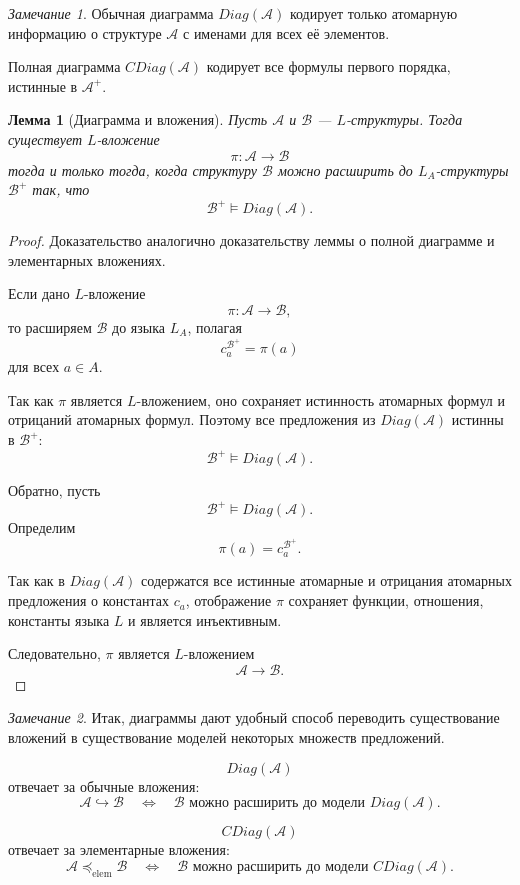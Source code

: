 \documentclass[12pt,a4paper,oneside,openany]{book}
\theoremstyle{definition}
\theoremstyle{plain}
\newtheorem{lemma}{Лемма}[chapter]
\theoremstyle{remark}
\newtheorem{remark}{Замечание}[chapter]
\begin{document}
\begin{remark}
Обычная диаграмма $Diag(\mathcal A)$ кодирует только атомарную информацию о структуре $\mathcal A$ с именами для всех её элементов.

Полная диаграмма $CDiag(\mathcal A)$ кодирует все формулы первого порядка, истинные в $\mathcal A^+$.
\end{remark}

\begin{lemma}[Диаграмма и вложения]
Пусть $\mathcal A$ и $\mathcal B$ — $L$-структуры. Тогда существует $L$-вложение
\[
\pi:\mathcal A\to\mathcal B
\]
тогда и только тогда, когда структуру $\mathcal B$ можно расширить до $L_A$-структуры $\mathcal B^+$ так, что
\[
\mathcal B^+\models Diag(\mathcal A).
\]
\end{lemma}

\begin{proof}
Доказательство аналогично доказательству леммы о полной диаграмме и элементарных вложениях.

Если дано $L$-вложение
\[
\pi:\mathcal A\to\mathcal B,
\]
то расширяем $\mathcal B$ до языка $L_A$, полагая
\[
c_a^{\mathcal B^+}=\pi(a)
\]
для всех $a\in A$.

Так как $\pi$ является $L$-вложением, оно сохраняет истинность атомарных формул и отрицаний атомарных формул. Поэтому все предложения из $Diag(\mathcal A)$ истинны в $\mathcal B^+$:
\[
\mathcal B^+\models Diag(\mathcal A).
\]

Обратно, пусть
\[
\mathcal B^+\models Diag(\mathcal A).
\]
Определим
\[
\pi(a)=c_a^{\mathcal B^+}.
\]

Так как в $Diag(\mathcal A)$ содержатся все истинные атомарные и отрицания атомарных предложения о константах $c_a$, отображение $\pi$ сохраняет функции, отношения, константы языка $L$ и является инъективным.

Следовательно, $\pi$ является $L$-вложением
\[
\mathcal A\to\mathcal B.
\]
\end{proof}

\begin{remark}
Итак, диаграммы дают удобный способ переводить существование вложений в существование моделей некоторых множеств предложений.

\[
Diag(\mathcal A)
\]
отвечает за обычные вложения:
\[
\mathcal A\hookrightarrow\mathcal B
\quad
\Longleftrightarrow
\quad
\mathcal B \text{ можно расширить до модели }Diag(\mathcal A).
\]

\[
CDiag(\mathcal A)
\]
отвечает за элементарные вложения:
\[
\mathcal A\preccurlyeq_{\mathrm{elem}}\mathcal B
\quad
\Longleftrightarrow
\quad
\mathcal B \text{ можно расширить до модели }CDiag(\mathcal A).
\]
\end{remark}
\end{document}
